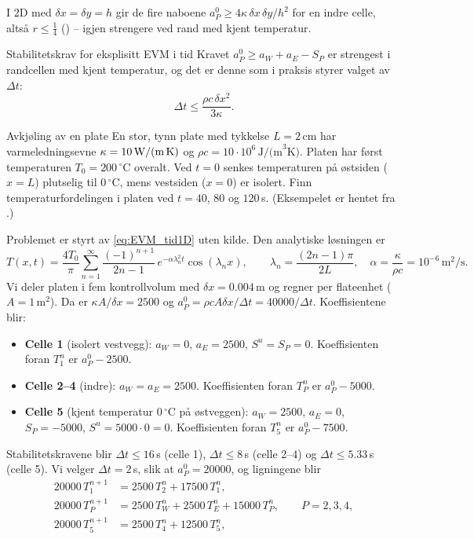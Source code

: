 I 2D med $\delta x=\delta y=h$ gir de fire naboene $a_P^0 \ge 4\kappa\,\delta x\,\delta y/h^2$ for en indre celle, altså $r\le\frac14$ () -- igjen strengere ved rand med kjent temperatur.

\begin{oppsum}{Stabilitetskrav for eksplisitt EVM i tid}
Kravet $a_P^0 \ge a_W+a_E-S_P$ er strengest i randcellen med kjent temperatur, og det er denne som i praksis styrer valget av $\Delta t$:
\[
\Delta t \le \frac{\rho c\,\delta x^2}{3\kappa} .
\]
\end{oppsum}

\begin{eks}{Avkjøling av en plate}\label{ex:EVM_tid_plate}
En stor, tynn plate med tykkelse $L = 2\,\text{cm}$ har varmeledningsevne $\kappa = 10\,\text{W/(m\,K)}$ og $\rho c = 10\cdot 10^6\,\text{J/(m}^3\text{K)}$. Platen har først temperaturen $T_0=200\,^\circ$C overalt. Ved $t=0$ senkes temperaturen på østsiden ($x=L$) plutselig til $0\,^\circ$C, mens vestsiden ($x=0$) er isolert. Finn temperaturfordelingen i platen ved $t=40$, $80$ og $120\,$s. (Eksempelet er hentet fra \cite{VaM07}.)
\end{eks}
Problemet er styrt av \eqref{eq:EVM_tid1D} uten kilde. Den analytiske løsningen er
\[
T(x,t) = \frac{4T_0}{\pi}\sum_{n=1}^{\infty}\frac{(-1)^{n+1}}{2n-1}\,e^{-\alpha\lambda_n^2 t}\cos(\lambda_n x), \qquad \lambda_n = \frac{(2n-1)\pi}{2L}, \quad \alpha = \frac{\kappa}{\rho c} = 10^{-6}\,\text{m}^2/\text{s}.
\]
Vi deler platen i fem kontrollvolum med $\delta x = 0.004\,\text{m}$ og regner per flateenhet ($A=1\,\text{m}^2$). Da er $\kappa A/\delta x = 2500$ og $a_P^0 = \rho c A\delta x/\Delta t = 40000/\Delta t$. Koeffisientene blir:
\begin{itemize}
\item \textbf{Celle 1} (isolert vestvegg): $a_W=0$, $a_E=2500$, $S^u=S_P=0$. Koeffisienten foran $T_1^n$ er $a_P^0 - 2500$.
\item \textbf{Celle 2--4} (indre): $a_W=a_E=2500$. Koeffisienten foran $T_P^n$ er $a_P^0 - 5000$.
\item \textbf{Celle 5} (kjent temperatur $0\,^\circ$C på østveggen): $a_W=2500$, $a_E=0$, $S_P=-5000$, $S^u = 5000\cdot 0 = 0$. Koeffisienten foran $T_5^n$ er $a_P^0 - 7500$.
\end{itemize}
Stabilitetskravene blir $\Delta t\le 16\,$s (celle 1), $\Delta t\le 8\,$s (celle 2--4) og $\Delta t\le 5.33\,$s (celle 5). Vi velger $\Delta t = 2\,$s, slik at $a_P^0 = 20000$, og ligningene blir
\[
\begin{aligned}
20000\,T_1^{n+1} &= 2500\,T_2^n + 17500\,T_1^n,\\
20000\,T_P^{n+1} &= 2500\,T_W^n + 2500\,T_E^n + 15000\,T_P^n, \qquad P = 2,3,4,\\
20000\,T_5^{n+1} &= 2500\,T_4^n + 12500\,T_5^n,
\end{aligned}
\]
